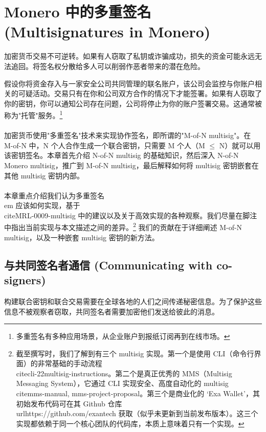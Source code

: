 \chapter{Monero 中的多重签名 (Multisignatures in Monero)}
\label{chapter:multisignatures}

加密货币交易不可逆转。如果有人窃取了私钥或诈骗成功，损失的资金可能永远无法追回。将签名权分散给多人可以削弱作恶者带来的潜在危险。

假设你将资金存入与一家安全公司共同管理的联名账户，该公司会监控与你账户相关的可疑活动。交易只有在你和公司双方合作的情况下才能签署。如果有人窃取了你的密钥，你可以通知公司存在问题，公司将停止为你的账户签署交易。这通常被称为"托管"服务。\footnote{多重签名有多种应用场景，从企业账户到报纸订阅再到在线市场。}\\\\

加密货币使用"多重签名"技术来实现协作签名，即所谓的"M-of-N multisig"。在 M-of-N 中，N 个人合作生成一个联合密钥，只需要 M 个人（M $\leq$ N）就可以用该密钥签名。本章首先介绍 N-of-N multisig 的基础知识，然后深入 N-of-N Monero multisig，推广到 M-of-N multisig，最后解释如何将 multisig 密钥嵌套在其他 multisig 密钥内部。\\\\

本章重点介绍我们认为多重签名{\\em 应该如何}实现，基于 \\cite{MRL-0009-multisig} 中的建议以及关于高效实现的各种观察。我们尽量在脚注中指出当前实现与本文描述之间的差异。\footnote{截至撰写时，我们了解到有三个 multisig 实现。第一个是使用 CLI（命令行界面）的非常基础的手动流程 \\cite{cli-22multisig-instructions}。第二个是真正优秀的 MMS（Multisig Messaging System），它通过 CLI 实现安全、高度自动化的 multisig \\cite{mms-manual, mms-project-proposal}。第三个是商业化的 `Exa Wallet'，其初始发布代码可在其 Github 仓库 \\url{https://github.com/exantech} 获取（似乎未更新到当前发布版本）。这三个实现都依赖于同一个核心团队的代码库，本质上意味着只有一个实现。} 我们的贡献在于详细阐述 M-of-N multisig，以及一种嵌套 multisig 密钥的新方法。


\section{与共同签名者通信 (Communicating with co-signers)}
\label{sec:communicating}

构建联合密钥和联合交易需要在全球各地的人们之间传递秘密信息。为了保护这些信息不被观察者窃取，共同签名者需要加密他们发送给彼此的消息。

